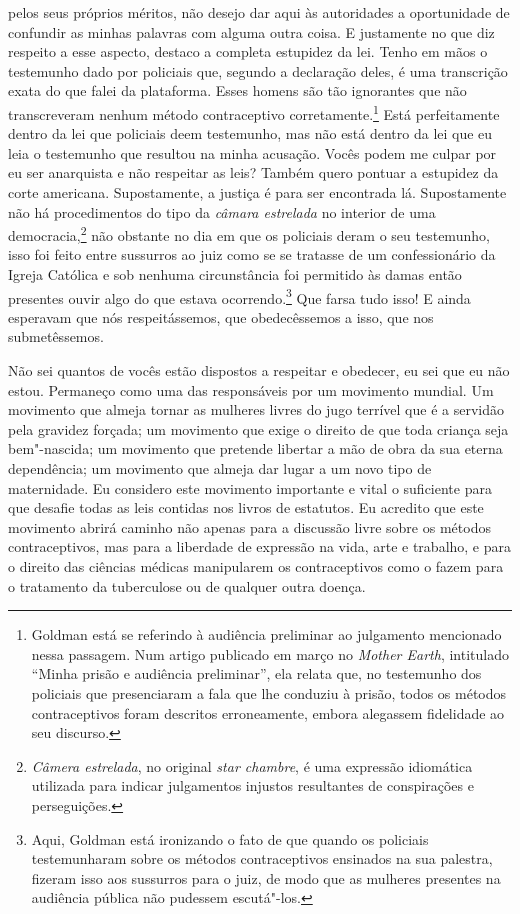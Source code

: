 pelos seus próprios méritos, não desejo dar aqui às autoridades a
oportunidade de confundir as minhas palavras com alguma outra coisa.
E justamente no que diz respeito a esse aspecto, destaco
a completa estupidez da lei. Tenho em
mãos o testemunho dado por policiais que, segundo a declaração deles, é
uma transcrição exata do que falei da plataforma. Esses homens são tão
ignorantes que não transcreveram nenhum método contraceptivo
corretamente.\footnote{Goldman está se referindo à audiência
  preliminar ao julgamento mencionado nessa passagem.
  Num artigo publicado em março no
  \textit{Mother Earth}, intitulado ``Minha prisão e audiência
  preliminar'', ela relata que, no testemunho dos policiais que
  presenciaram a fala que lhe conduziu à prisão, todos os métodos
  contraceptivos foram descritos erroneamente, embora alegassem
  fidelidade ao seu discurso.} Está perfeitamente dentro da lei que
policiais deem testemunho, mas não está dentro da lei que eu leia o
testemunho que resultou na minha acusação. Vocês podem me culpar por eu
ser anarquista e não respeitar as leis? Também quero pontuar a estupidez
da corte americana. Supostamente, a justiça é para ser encontrada lá.
Supostamente não há procedimentos do tipo da \textit{câmara estrelada} no interior de uma
democracia,\footnote{\textit{Câmera estrelada}, no original \textit{star chambre}, é
  uma expressão idiomática utilizada para indicar julgamentos injustos
  resultantes de conspirações e perseguições.} não obstante no dia em que
os policiais deram o seu testemunho, isso foi feito entre sussurros ao
juiz como se se tratasse de um confessionário da Igreja Católica e sob
nenhuma circunstância foi permitido às damas então presentes ouvir algo
do que estava ocorrendo.\footnote{Aqui, Goldman está ironizando o fato
  de que quando os policiais testemunharam sobre os métodos
  contraceptivos ensinados na sua palestra, fizeram isso aos sussurros
  para o juiz, de modo que as mulheres presentes na audiência pública
  não pudessem escutá"-los.} Que farsa tudo isso! E ainda esperavam que
nós respeitássemos, que obedecêssemos a isso, que nos submetêssemos.

Não sei quantos de vocês estão dispostos a respeitar e obedecer, eu sei
que eu não estou. Permaneço como uma das responsáveis por um movimento
mundial. Um movimento que almeja tornar as mulheres livres do jugo
terrível que é a servidão pela gravidez forçada; um movimento que exige
o direito de que toda criança seja bem"-nascida; um movimento que
pretende libertar a mão de obra da sua eterna dependência; um movimento
que almeja dar lugar a um novo tipo de maternidade. Eu considero este
movimento importante e vital o suficiente para que desafie todas as leis
contidas nos livros de estatutos. Eu acredito que este movimento abrirá
caminho não apenas para a discussão livre sobre os métodos
contraceptivos, mas para a liberdade de expressão na vida, arte e
trabalho, e para o direito das ciências médicas manipularem os
contraceptivos como o fazem para o tratamento da tuberculose ou de
qualquer outra doença.

